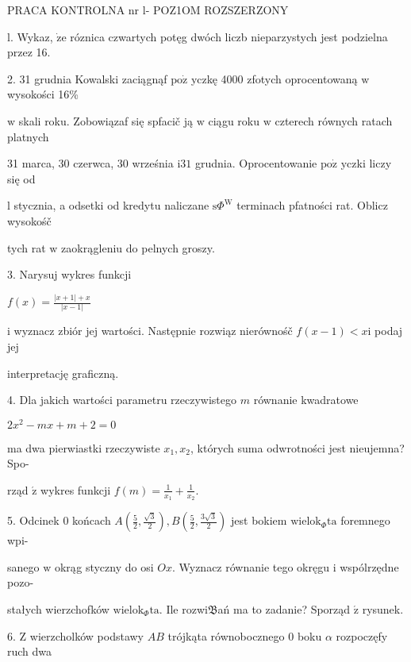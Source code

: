 \documentclass[a4paper,12pt]{article}
\begin{document}
PRACA KONTROLNA nr l- POZ1OM ROZSZERZONY

l. Wykaz, $\dot{\mathrm{z}}\mathrm{e}$ róznica czwartych potęg dwóch liczb nieparzystych jest podzielna przez 16.

2. 31 grudnia Kowalski zaciągnąf $\mathrm{p}\mathrm{o}\dot{\mathrm{z}}$ yczkę 4000 zfotych oprocentowaną $\mathrm{w}$ wysokości 16\%

$\mathrm{w}$ skali roku. Zobowiązaf się spfacič ją $\mathrm{w}$ ciągu roku $\mathrm{w}$ czterech równych ratach platnych

31 marca, 30 czerwca, 30 września $\mathrm{i}31$ grudnia. Oprocentowanie $\mathrm{p}\mathrm{o}\dot{\mathrm{z}}$ yczki liczy się od

l stycznia, a odsetki od kredytu naliczane $\mathrm{s}\Phi^{\mathrm{W}}$ terminach pfatności rat. Oblicz wysokośč

tych rat $\mathrm{w}$ zaokrągleniu do pelnych groszy.

3. Narysuj wykres funkcji

$f(x)=\displaystyle \frac{|x+1|+x}{|x-1|}$

$\mathrm{i}$ wyznacz zbiór jej wartości. Następnie rozwiąz nierównośč $f(x-1) < x \mathrm{i}$ podaj jej

interpretację graficzną.

4. Dla jakich wartości parametru rzeczywistego $m$ równanie kwadratowe

$2x^{2}-mx+m+2=0$

ma dwa pierwiastki rzeczywiste $x_{1}, x_{2}$, których suma odwrotności jest nieujemna? Spo-

rząd $\acute{\mathrm{z}}$ wykres funkcji $f(m)=\displaystyle \frac{1}{x_{1}}+\frac{1}{x_{2}}.$

5. Odcinek $0$ końcach $A(\displaystyle \frac{5}{2},\frac{\sqrt{3}}{2}), B(\displaystyle \frac{5}{2},\frac{3\sqrt{3}}{2})$ jest bokiem $\mathrm{w}\mathrm{i}\mathrm{e}\mathrm{l}\mathrm{o}\mathrm{k}_{\Phi}\mathrm{t}\mathrm{a}$ foremnego wpi-

sanego $\mathrm{w}$ okrąg styczny do osi $Ox$. Wyznacz równanie tego okręgu $\mathrm{i}$ wspólrzędne pozo-

stałych wierzchofków $\mathrm{w}\mathrm{i}\mathrm{e}\mathrm{l}\mathrm{o}\mathrm{k}_{\Phi}\mathrm{t}\mathrm{a}$. Ile rozwi$\mathfrak{B}$ań ma to zadanie? Sporząd $\acute{\mathrm{z}}$ rysunek.

6. $\mathrm{Z}$ wierzcholków podstawy $AB$ trójkąta równobocznego $0$ boku $\alpha$ rozpoczęfy ruch dwa
\end{document}
